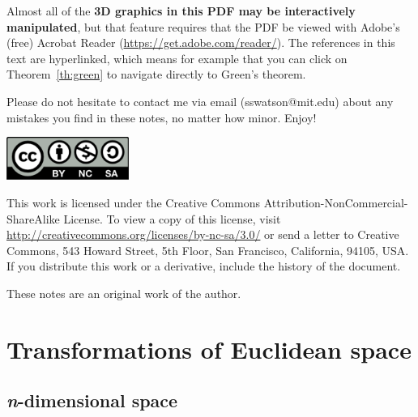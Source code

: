 \documentclass[svgnames]{report}
\begin{document}
\vspace{6pt}

Almost all of the \textbf{3D graphics in this PDF may be interactively manipulated},
but that feature requires that the PDF be viewed with Adobe's (free) Acrobat
Reader
(\href{https://get.adobe.com/reader/}{\url{https://get.adobe.com/reader/}}). The
references in this text are hyperlinked, which means for example that you can click on
Theorem~\ref{th:green} to navigate directly to Green's theorem. 

Please do not hesitate to contact me via email (sswatson@mit.edu)
about any mistakes you find in these notes, no matter how
minor. Enjoy!

\newpage

\null\vfill

\includegraphics[width=4cm]{figures/cc-by-nc-sa.pdf}

{\small
This work is licensed under the Creative Commons
Attribution-NonCommercial-ShareAlike License. To view a copy of this
license, visit 
\url{http://creativecommons.org/licenses/by-nc-sa/3.0/} 
or
send a letter to Creative Commons, 543 Howard Street, 5th Floor, San
Francisco, California, 94105, USA. If you distribute this work or a
derivative, include the history of the document.

These notes are an original work of the author. 
}

\vspace{5cm}


\newpage 

\tableofcontents

\newpage 

\chapter{Transformations of Euclidean space}

\section{\textit{n}-dimensional space}

\reversemarginpar

\setlength{\wrapoverhang}{\marginparwidth}
\end{document}
